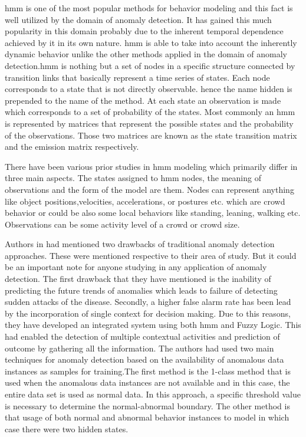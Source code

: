 \documentclass[a4paper,12pt]{report}
\begin{document}
\begin{itemize}
\gls{hmm} is one of the most popular methods for behavior modeling and this fact is well utilized by the domain of anomaly detection. It has gained this much popularity in this domain probably due to the inherent temporal dependence achieved by it in its own nature. \gls{hmm} is able to take into account the inherently dynamic behavior unlike the other methods applied in the domain of anomaly detection.\gls{hmm} is nothing but a set of nodes in a specific structure connected by transition links that basically represent a time series of states. Each node corresponds to a state that is not directly observable. hence the name hidden is prepended to the name of the method. At each state an observation is made which corresponds to a set of probability of the states. Most commonly an \gls{hmm} is represented by matrices that represent the possible states and the probability of the observations. Those two matrices are known as the state transition matrix and the emission matrix respectively.

There have been various prior studies in \gls{hmm} modeling which primarily differ in three main aspects. The states assigned to \gls{hmm} nodes, the meaning of observations and the form of the model are them. Nodes can represent anything like object positions,velocities, accelerations, or postures etc. which are crowd behavior or could be also some local behaviors like standing, leaning, walking etc. Observations can be some activity level of a crowd or crowd size. 

Authors in \cite{ambient} had mentioned two drawbacks of traditional anomaly detection approaches. These were mentioned respective to their area of study. But it could be an important note for anyone studying in any application of anomaly detection. The first drawback that they have mentioned is the inability of predicting the future trends of anomalies which leads to failure of detecting sudden attacks of the disease. Secondly, 
a higher false alarm rate has been lead by the incorporation of single context for decision making. Due to this reasons, they have developed an integrated system using both \gls{hmm} and Fuzzy Logic. This had enabled the detection of multiple contextual activities and prediction of outcome by gathering all the information. The authors had used two main techniques for anomaly detection based on the availability of anomalous data instances as samples for training.The first method is the 1-class method that is used when the anomalous data instances are not available and in this case, the entire data set is used as normal data. In this approach, a specific threshold value is necessary to determine the normal-abnormal boundary. The other method is that usage of both normal and abnormal behavior instances to model in which case there were two hidden states.     


\end{itemize}
\end{document}
